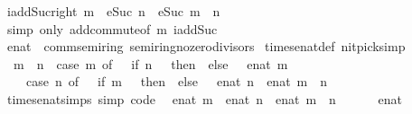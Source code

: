 \begin{isabellebody}
\isamarkupfalse%
\ iadd{\isacharunderscore}Suc{\isacharunderscore}right{\isacharcolon}\ {\isachardoublequoteopen}m\ {\isacharplus}\ eSuc\ n\ {\isacharequal}\ eSuc\ {\isacharparenleft}m\ {\isacharplus}\ n{\isacharparenright}{\isachardoublequoteclose}\isanewline
%
\isadelimproof
\ \ %
\endisadelimproof
%
\isatagproof
{}\isamarkupfalse%
\ {\isacharparenleft}simp\ only{\isacharcolon}\ add{\isachardot}commute{\isacharbrackleft}of\ m{\isacharbrackright}\ iadd{\isacharunderscore}Suc{\isacharparenright}%
\endisatagproof
{\isafoldproof}%
%
\isadelimproof
%
\endisadelimproof
%
\isadelimdocument
%
\endisadelimdocument
%
\isatagdocument
%
\isamarkuptrue%
%
\endisatagdocument
{\isafolddocument}%
%
\isadelimdocument
%
\endisadelimdocument
{}\isamarkupfalse%
\ enat\ {\isacharcolon}{\isacharcolon}\ {\isachardoublequoteopen}{\isacharbraceleft}comm{\isacharunderscore}semiring{\isacharunderscore}{}{\isacharcomma}\ semiring{\isacharunderscore}no{\isacharunderscore}zero{\isacharunderscore}divisors{\isacharbraceright}{\isachardoublequoteclose}\isanewline
{}\isanewline
\isanewline
{}\isamarkupfalse%
\ times{\isacharunderscore}enat{\isacharunderscore}def\ {\isacharbrackleft}nitpick{\isacharunderscore}simp{\isacharbrackright}{\isacharcolon}\isanewline
\ \ {\isachardoublequoteopen}m\ {\isacharasterisk}\ n\ {\isacharequal}\ {\isacharparenleft}case\ m\ of\ {\isasyminfinity}\ {\isasymRightarrow}\ if\ n\ {\isacharequal}\ {}\ then\ {}\ else\ {\isasyminfinity}\ {\isacharbar}\ enat\ m\ {\isasymRightarrow}\isanewline
\ \ \ \ {\isacharparenleft}case\ n\ of\ {\isasyminfinity}\ {\isasymRightarrow}\ if\ m\ {\isacharequal}\ {}\ then\ {}\ else\ {\isasyminfinity}\ {\isacharbar}\ enat\ n\ {\isasymRightarrow}\ enat\ {\isacharparenleft}m\ {\isacharasterisk}\ n{\isacharparenright}{\isacharparenright}{\isacharparenright}{\isachardoublequoteclose}\isanewline
\isanewline
{}\isamarkupfalse%
\ times{\isacharunderscore}enat{\isacharunderscore}simps\ {\isacharbrackleft}simp{\isacharcomma}\ code{\isacharbrackright}{\isacharcolon}\isanewline
\ \ {\isachardoublequoteopen}enat\ m\ {\isacharasterisk}\ enat\ n\ {\isacharequal}\ enat\ {\isacharparenleft}m\ {\isacharasterisk}\ n{\isacharparenright}{\isachardoublequoteclose}\isanewline
\ \ {\isachardoublequoteopen}{\isasyminfinity}\ {\isacharasterisk}\ {\isasyminfinity}\ {\isacharequal}\ {\isacharparenleft}{\isasyminfinity}{\isacharcolon}{\isacharcolon}enat{\isacharparenright}{\isachardoublequoteclose}\isanewline

\end{isabellebody}

